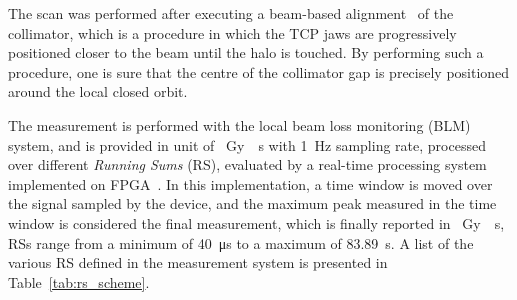 The scan was performed after executing a beam-based alignment~\cite{valentino2012semiautomatic} of the collimator, which is a procedure in which the TCP jaws are progressively positioned closer to the beam until the halo is touched. By performing such a procedure, one is sure that the centre of the collimator gap is precisely positioned around the local closed orbit.

The measurement is performed with the local beam loss monitoring (BLM) system, and is provided in unit of \SI{}{Gy \per s} with \SI{1}{Hz} sampling rate, processed over different \textit{Running Sums} (RS), evaluated by a real-time processing system implemented on FPGA~\cite{4179157}. In this implementation, a time window is moved over the signal sampled by the device, and the maximum peak measured in the time window is considered the final measurement, which is finally reported in \SI{}{Gy \per s}, RSs range from a minimum of \SI{40}{\micro s} to a maximum of \SI{83.89}{s}. A list of the various RS defined in the measurement system is presented in Table~\ref{tab:rs_scheme}.


